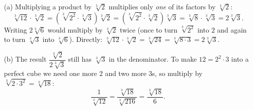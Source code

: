 (a) Multiplying a product by $\sqrt[3]2$ multiplies only \emph{one} of its factors by $\sqrt[3]2$:
\[
\sqrt[3]{12}\cdot\sqrt[3]2=\left(\sqrt[3]{2^2}\cdot\sqrt[3]3\right)\sqrt[3]2=\left(\sqrt[3]{2^2}\cdot\sqrt[3]2\right)\sqrt[3]3=\sqrt[3]{8}\cdot\sqrt[3]3=2\sqrt[3]3 .
\]
Writing $2\sqrt[3]6$ would multiply by $\sqrt[3]2$ twice (once to turn $\sqrt[3]{2^2}$ into $2$ and again to turn $\sqrt[3]3$ into $\sqrt[3]6$). Directly: $\sqrt[3]{12}\cdot\sqrt[3]2=\sqrt[3]{24}=\sqrt[3]{8\cdot3}=2\sqrt[3]3$.

(b) The result $\dfrac{\sqrt[3]2}{2\sqrt[3]3}$ still has $\sqrt[3]3$ in the denominator. To make $12=2^2\cdot3$ into a perfect cube we need one more $2$ and two more $3$s, so multiply by $\sqrt[3]{2\cdot3^2}=\sqrt[3]{18}$:
\[
\dfrac{1}{\sqrt[3]{12}}=\dfrac{\sqrt[3]{18}}{\sqrt[3]{216}}=\boxed{\dfrac{\sqrt[3]{18}}{6}}.
\]

